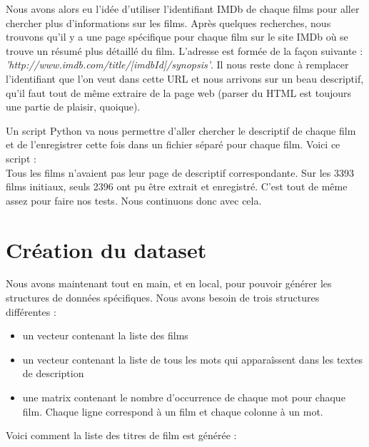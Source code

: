Nous avons alors eu l'idée d'utiliser l'identifiant IMDb de chaque films pour aller chercher plus d'informations sur les films. Après quelques recherches, nous trouvons qu'il y a une page spécifique pour chaque film sur le site IMDb où se trouve un résumé plus détaillé du film. L'adresse est formée de la façon suivante : \textit{'http://www.imdb.com/title/[imdbId]/synopsis'}. Il nous reste donc à remplacer l'identifiant que l'on veut dans cette URL et nous arrivons sur un beau descriptif, qu'il faut tout de même extraire de la page web (parser du HTML est toujours une partie de plaisir, quoique).

Un script Python va nous permettre d'aller chercher le descriptif de chaque film et de l'enregistrer cette fois dans un fichier séparé pour chaque film. Voici ce script : \\



Tous les films n'avaient pas leur page de descriptif correspondante. Sur les 3393 films initiaux, seuls 2396 ont pu être extrait et enregistré. C'est tout de même assez pour faire nos tests. Nous continuons donc avec cela.

\section{Création du dataset}

Nous avons maintenant tout en main, et en local, pour pouvoir générer les structures de données spécifiques. Nous avons besoin de trois structures différentes :

\begin{itemize}
 \item un vecteur contenant la liste des films
 \item un vecteur contenant la liste de tous les mots qui apparaîssent dans les textes de description 
 \item une matrix contenant le nombre d'occurrence de chaque mot pour chaque film. Chaque ligne correspond à un film et chaque colonne à un mot.
\end{itemize}

\vspace{0.4cm}
%
Voici comment la liste des titres de film est générée : \\

